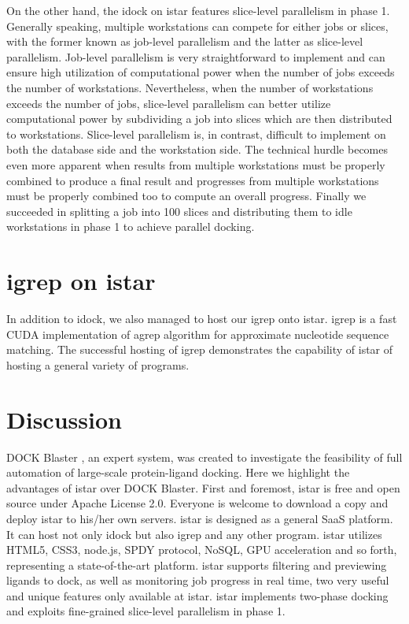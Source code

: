 \documentclass{bioinfo}
\begin{document}
On the other hand, the idock on istar features slice-level parallelism in phase 1. Generally speaking, multiple workstations can compete for either jobs or slices, with the former known as job-level parallelism and the latter as slice-level parallelism. Job-level parallelism is very straightforward to implement and can ensure high utilization of computational power when the number of jobs exceeds the number of workstations. Nevertheless, when the number of workstations exceeds the number of jobs, slice-level parallelism can better utilize computational power by subdividing a job into slices which are then distributed to workstations. Slice-level parallelism is, in contrast, difficult to implement on both the database side and the workstation side. The technical hurdle becomes even more apparent when results from multiple workstations must be properly combined to produce a final result and progresses from multiple workstations must be properly combined too to compute an overall progress. Finally we succeeded in splitting a job into 100 slices and distributing them to idle workstations in phase 1 to achieve parallel docking.

\section{igrep on istar}

In addition to idock, we also managed to host our igrep \citep{1138} onto istar. igrep is a fast CUDA implementation of agrep algorithm for approximate nucleotide sequence matching. The successful hosting of igrep demonstrates the capability of istar of hosting a general variety of programs.

\section{Discussion}

DOCK Blaster \citep{557}, an expert system, was created to investigate the feasibility of full automation of large-scale protein-ligand docking. Here we highlight the advantages of istar over DOCK Blaster. First and foremost, istar is free and open source under Apache License 2.0. Everyone is welcome to download a copy and deploy istar to his/her own servers. istar is designed as a general SaaS platform. It can host not only idock but also igrep and any other program. istar utilizes HTML5, CSS3, node.js, SPDY protocol, NoSQL, GPU acceleration and so forth, representing a state-of-the-art platform. istar supports filtering and previewing ligands to dock, as well as monitoring job progress in real time, two very useful and unique features only available at istar. istar implements two-phase docking and exploits fine-grained slice-level parallelism in phase 1.
\end{document}

